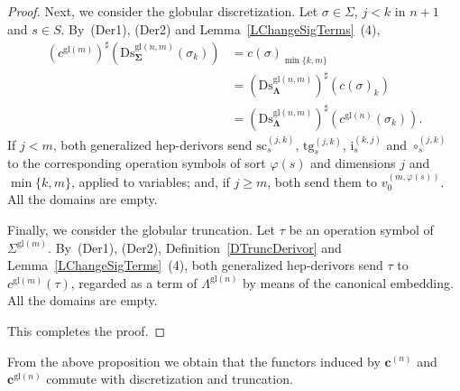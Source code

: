 \documentclass[a4paper, reqno
]{amsart}
\newcommand{\sig}[1]{\mathbf{#1}}             %
\newcommand{\gl}{\mathrm{gl}}                %
\newcommand{\src}{\mathrm{sc}}
\newcommand{\tgt}{\mathrm{tg}}
\newcommand{\Ds}{\mathrm{Ds}}
\theoremstyle{plain}
\theoremstyle{definition}
\begin{document}
\begin{proof}
Next, we consider the globular discretization.
Let $\sigma\in\Sigma$, $j<k$ in $n+1$ and $s\in S$.
By~(Der1), (Der2) and Lemma~\ref{LChangeSigTerms}~(4),
\begin{align*}
(c^{\gl(m)})^{\sharp}\left(\Ds^{\gl(n,m)}_{\sig{\Sigma}}(\sigma_{k})\right)
&=
c(\sigma)_{\min\{k,m\}}
\\&=
(\Ds^{\gl(n,m)}_{\sig{\Lambda}})^{\sharp}\left(c(\sigma)_{k}\right)
\\&=
(\Ds^{\gl(n,m)}_{\sig{\Lambda}})^{\sharp}\left(c^{\gl(n)}(\sigma_{k})\right).
\end{align*}
If $j<m$, both generalized hep-derivors send $\src^{(j,k)}_{s}$, $\tgt^{(j,k)}_{s}$, $\mathrm{i}^{(k,j)}_{s}$ and $\circ^{(j,k)}_{s}$ to the corresponding operation symbols of sort $\varphi(s)$ and dimensions $j$ and $\min\{k,m\}$, applied to variables; and, if $j\geq m$, both send them to $v^{(m,\varphi(s))}_{0}$.
All the domains are empty.

Finally, we consider the globular truncation.
Let $\tau$ be an operation symbol of $\Sigma^{\gl(m)}$.
By~(Der1), (Der2), Definition~\ref{DTruncDerivor} and Lemma~\ref{LChangeSigTerms}~(4), both generalized hep-derivors send $\tau$ to $c^{\gl(m)}(\tau)$, regarded as a term of $\Lambda^{\gl(n)}$ by means of the canonical embedding.
All the domains are empty.

This completes the proof.
\end{proof}

From the above proposition we obtain that the functors induced by $\mathbf{c}^{(n)}$ and $\mathbf{c}^{\gl(n)}$ commute with discretization and truncation.
\end{document}
